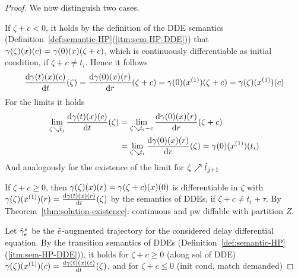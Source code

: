 \begin{proof}
        We now distinguish two cases.

        If $\zeta+c<0$, it holds by the definition of the DDE semantics (Definition~\ref{def:semantic-HP}(\ref{itm:sem-HP-DDE})) that $\trajectory(\zeta)(x)(c)=\trajectory(0)(x)(\zeta+c)$, which is continuously differentiable as initial condition, if $\zeta+c\neq t_i$. Hence it follows
        \begin{equation*}
            \DD{\trajectory(t)(x)(c)}{t}(\zeta)=\DD{\trajectory(0)(x)(\past)}{\past}(\zeta+c)=\trajectory(0)(\D{x})(\zeta+c)=\trajectory(\zeta)(\D{x})(c)
        \end{equation*}
        For the limits it holds
        \begin{align*}
            \lim_{\zeta\downto\hat{t}_j} \DD{\trajectory(t)(x)(c)}{t}(\zeta)
                & = \lim_{\zeta\downto t_i-c} \DD{\trajectory(0)(x)(\past)}{\past}(\zeta+c)\\
                & = \lim_{\zeta\downto t_i} \DD{\trajectory(0)(x)(\past)}{\past}(\zeta)
                = \trajectory(0)(\D{x})(t_i)
        \end{align*}
        And analogously for the existence of the limit for $\zeta\upto\hat{t}_{j+1}$

        If $\zeta+c\geq 0$, then $\trajectory(\zeta)(x)(\past)=\trajectory(\zeta+c)(x)(0)$ is differentiable in $\zeta$ with $\trajectory(\zeta)(\D{x})(\past) = \DD{\trajectory(t)(x)(\past)}{t}(\zeta)$ by the semantics of DDEs, if $\zeta+c\neq t_i+\tau$.
        By Theorem~\ref{thm:solution-existence}: continuous and pw diffable with partition $Z$.



        Let $\sampledtraj[s]{\astrm}$ be the $\bstrm$-augmented trajectory for the considered delay differential equation.
        By the transition semantics of DDEs (Definition~\ref{def:semantic-HP}\,(\ref{itm:sem-HP-DDE})), it holds for $\zeta+c\geq 0$ (along sol of DDE)
        $\trajectory(\zeta)(\D{x})(c) = \DD{\trajectory(t)(x)(c)}{t}(\zeta)$, and for $\zeta+c\leq 0$ (init cond, match demanded)


\end{proof}
